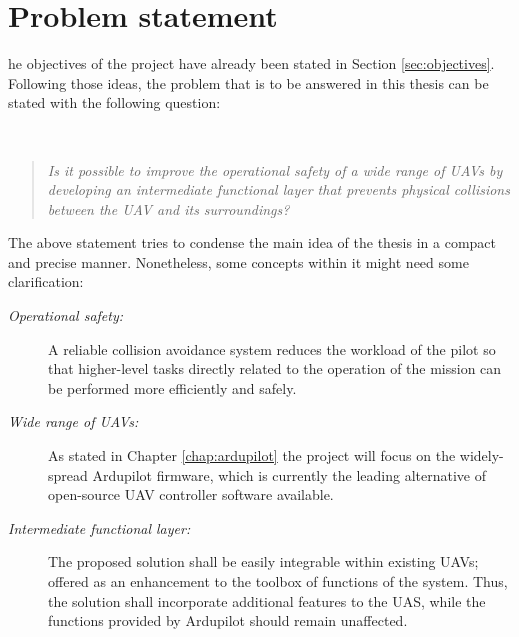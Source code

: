 
\let\textcircled=\pgftextcircled
\chapter{Problem statement} \label{chap:problem}

he objectives of the project have already been stated in Section \ref{sec:objectives}.
Following those ideas, the problem that is to be answered in this thesis can be stated with the following question:

\begin{flushright}
	\colorbox{teal!30}{\begin{minipage}[c]{0.01\textwidth}
		~\\[6em]
	\end{minipage}}
	\hspace{-2em}
	\begin{minipage}[c]{0.95\textwidth}
		\begin{quote}
			\large \em
			Is it possible to improve the operational safety of a wide range of UAVs by developing an intermediate functional layer that prevents physical collisions between the UAV and its surroundings?
		\end{quote}
	\end{minipage}
\end{flushright}

The above statement tries to condense the main idea of the thesis in a compact and precise manner.
Nonetheless, some concepts within it might need some clarification:

\begin{description}

	\item[\itshape Operational safety:] A reliable collision avoidance system reduces the workload of the pilot so that higher-level tasks directly related to the operation of the mission can be performed more efficiently and safely.
	\item[\itshape Wide range of UAVs:] As stated in Chapter \ref{chap:ardupilot} the project will focus on the widely-spread Ardupilot firmware, which is currently the leading alternative of open-source UAV controller software available.
	\item[\itshape Intermediate functional layer:] The proposed solution shall be easily integrable within existing UAVs; offered as an enhancement to the toolbox of functions of the system.
		Thus, the solution shall incorporate additional features to the UAS, while the functions provided by Ardupilot should remain unaffected.

\end{description}

